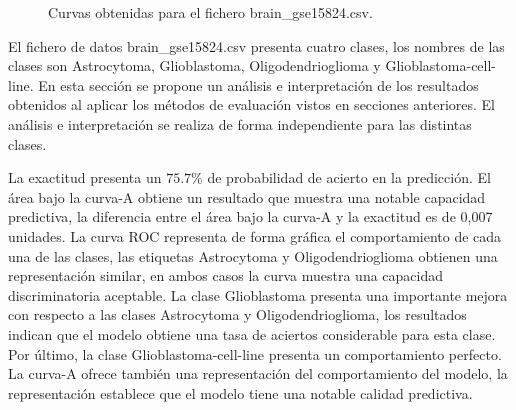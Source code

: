 \bigbreak

\begin{figure}[htp]
    \centering
    \caption{Curvas obtenidas para el fichero brain\_gse15824.csv.}
    \label{fig:10}
\end{figure}

\bigbreak

El fichero de datos brain\_gse15824.csv presenta cuatro clases, los nombres de las clases son Astrocytoma, Glioblastoma, Oligodendrioglioma y Glioblastoma-cell-line. En esta sección se propone un análisis e interpretación de los resultados obtenidos al aplicar los métodos de evaluación vistos en secciones anteriores. El análisis e interpretación se realiza de forma independiente para las distintas clases.

\bigbreak

La exactitud presenta un $75.7$\% de probabilidad de acierto en la predicción. El área bajo la curva-A obtiene un resultado que muestra una notable capacidad predictiva, la diferencia entre el área bajo la curva-A y la exactitud es de 0,007 unidades. La curva ROC representa de forma gráfica el comportamiento de cada una de las clases, las etiquetas Astrocytoma y Oligodendrioglioma obtienen una representación similar, en ambos casos la curva muestra una capacidad discriminatoria aceptable. La clase Glioblastoma presenta una importante mejora con respecto a las clases Astrocytoma y Oligodendrioglioma, los resultados indican que el modelo obtiene una tasa de aciertos considerable para esta clase. Por último, la clase Glioblastoma-cell-line presenta un comportamiento perfecto. La curva-A ofrece también una representación del comportamiento del modelo, la representación establece que el modelo tiene una notable calidad predictiva.

\bigbreak

